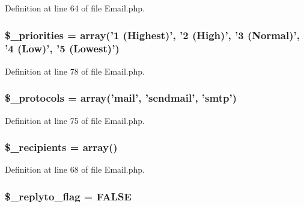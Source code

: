 Definition at line 64 of file Email.\-php.

\hypertarget{class_c_i___email_af2e56ba04b214aad41be6db88e729645}{
\subsubsection[{\$\-\_\-priorities}]{\setlength{\rightskip}{0pt plus 5cm}\$\-\_\-priorities = array('1 (Highest)', '2 (High)', '3 (Normal)', '4 (Low)', '5 (Lowest)')}}\label{class_c_i___email_af2e56ba04b214aad41be6db88e729645}


Definition at line 78 of file Email.\-php.

\hypertarget{class_c_i___email_a67dcd847790518bf5fbe6576a0c11c04}{
\subsubsection[{\$\-\_\-protocols}]{\setlength{\rightskip}{0pt plus 5cm}\$\-\_\-protocols = array('mail', 'sendmail', 'smtp')}}\label{class_c_i___email_a67dcd847790518bf5fbe6576a0c11c04}


Definition at line 75 of file Email.\-php.

\hypertarget{class_c_i___email_aa5f5e78dd9477bdec18b4aadae77ba13}{
\subsubsection[{\$\-\_\-recipients}]{\setlength{\rightskip}{0pt plus 5cm}\$\-\_\-recipients = array()}}\label{class_c_i___email_aa5f5e78dd9477bdec18b4aadae77ba13}


Definition at line 68 of file Email.\-php.

\hypertarget{class_c_i___email_a00e8e2c2c72e6acf2cd91a8c4498695a}{
\subsubsection[{\$\-\_\-replyto\-\_\-flag}]{\setlength{\rightskip}{0pt plus 5cm}\$\-\_\-replyto\-\_\-flag = F\-A\-L\-S\-E}}\label{class_c_i___email_a00e8e2c2c72e6acf2cd91a8c4498695a}


